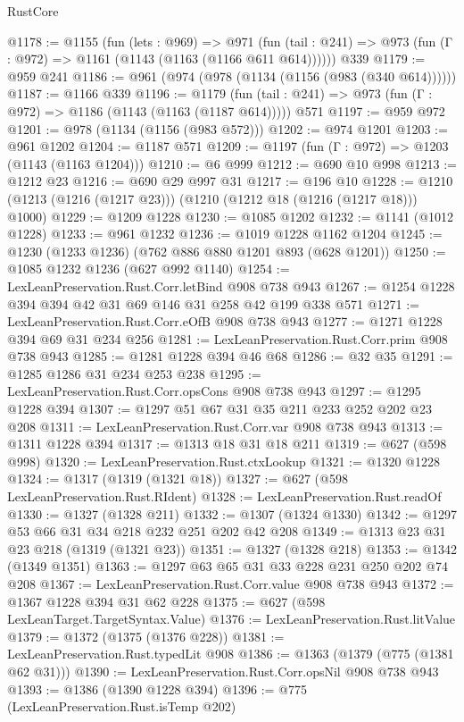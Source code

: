 \begin{lexlean}{RustCore}
\begin{coremodule}
@1178 := @1155
    (fun (lets : @969) =>
    @971 (fun (tail : @241) => @973 (fun (Γ : @972) => @1161 (@1143 (@1163 (@1166 @611 @614))))))
    @339
@1179 := @959 @241
@1186 := @961 (@974 (@978 (@1134 (@1156 (@983 (@340 @614))))))
@1187 := @1166 @339
@1196 := @1179
    (fun (tail : @241) => @973 (fun (Γ : @972) => @1186 (@1143 (@1163 (@1187 @614)))))
    @571
@1197 := @959 @972
@1201 := @978 (@1134 (@1156 (@983 @572)))
@1202 := @974 @1201
@1203 := @961 @1202
@1204 := @1187 @571
@1209 := @1197 (fun (Γ : @972) => @1203 (@1143 (@1163 @1204)))
@1210 := @6 @999
@1212 := @690 @10 @998
@1213 := @1212 @23
@1216 := @690 @29 @997 @31
@1217 := @196 @10
@1228 := @1210 (@1213 (@1216 (@1217 @23))) (@1210 (@1212 @18 (@1216 (@1217 @18))) @1000)
@1229 := @1209 @1228
@1230 := @1085 @1202
@1232 := @1141 (@1012 @1228)
@1233 := @961 @1232
@1236 := @1019 @1228 @1162 @1204
@1245 := @1230 (@1233 @1236) (@762 @886 @880 @1201 @893 (@628 @1201))
@1250 := @1085 @1232 @1236 (@627 @992 @1140)
@1254 := LexLeanPreservation.Rust.Corr.letBind @908 @738 @943
@1267 := @1254 @1228 @394 @394 @42 @31 @69 @146 @31 @258 @42 @199 @338 @571
@1271 := LexLeanPreservation.Rust.Corr.eOfB @908 @738 @943
@1277 := @1271 @1228 @394 @69 @31 @234 @256
@1281 := LexLeanPreservation.Rust.Corr.prim @908 @738 @943
@1285 := @1281 @1228 @394 @46 @68
@1286 := @32 @35
@1291 := @1285 @1286 @31 @234 @253 @238
@1295 := LexLeanPreservation.Rust.Corr.opsCons @908 @738 @943
@1297 := @1295 @1228 @394
@1307 := @1297 @51 @67 @31 @35 @211 @233 @252 @202 @23 @208
@1311 := LexLeanPreservation.Rust.Corr.var @908 @738 @943
@1313 := @1311 @1228 @394
@1317 := @1313 @18 @31 @18 @211
@1319 := @627 (@598 @998)
@1320 := LexLeanPreservation.Rust.ctxLookup
@1321 := @1320 @1228
@1324 := @1317 (@1319 (@1321 @18))
@1327 := @627 (@598 LexLeanPreservation.Rust.RIdent)
@1328 := LexLeanPreservation.Rust.readOf
@1330 := @1327 (@1328 @211)
@1332 := @1307 (@1324 @1330)
@1342 := @1297 @53 @66 @31 @34 @218 @232 @251 @202 @42 @208
@1349 := @1313 @23 @31 @23 @218 (@1319 (@1321 @23))
@1351 := @1327 (@1328 @218)
@1353 := @1342 (@1349 @1351)
@1363 := @1297 @63 @65 @31 @33 @228 @231 @250 @202 @74 @208
@1367 := LexLeanPreservation.Rust.Corr.value @908 @738 @943
@1372 := @1367 @1228 @394 @31 @62 @228
@1375 := @627 (@598 LexLeanTarget.TargetSyntax.Value)
@1376 := LexLeanPreservation.Rust.litValue
@1379 := @1372 (@1375 (@1376 @228))
@1381 := LexLeanPreservation.Rust.typedLit @908
@1386 := @1363 (@1379 (@775 (@1381 @62 @31)))
@1390 := LexLeanPreservation.Rust.Corr.opsNil @908 @738 @943
@1393 := @1386 (@1390 @1228 @394)
@1396 := @775 (LexLeanPreservation.Rust.isTemp @202)

\end{coremodule}
\end{lexlean}
